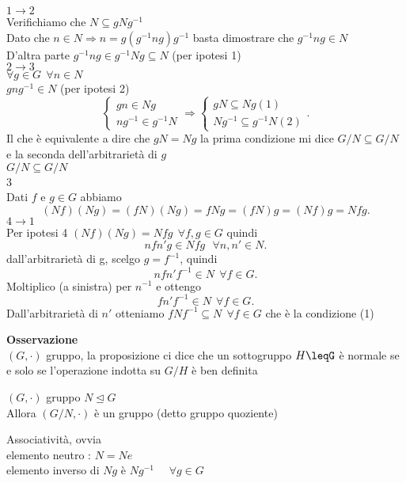 \documentclass[12px]{article}
\begin{document}
	\begin{dimo}
		$1 \rightarrow 2$\\
		Verifichiamo che $N\subseteq gNg^{-1}$\\
		Dato che  $n\in N \Rightarrow n = g(g^{-1}ng)g^{-1}$ basta dimostrare che $g^{-1}ng\in N$\\
		D'altra parte  $g^{-1}ng\in g^{-1}Ng\subseteq N$ (per ipotesi 1)\\
		$2 \rightarrow 3$\\
		$\forall g\in G \ \ \forall n\in N$\\
		$gng^{-1}\in N$ (per ipotesi 2)
		\[
		\begin{cases}
			gn\in Ng\\
			ng^{-1}\in g^{-1}N
		\end{cases} \Rightarrow \begin{cases}
			gN\subseteq Ng (1)\\
			Ng^{-1} \subseteq g^{-1}N (2)
		\end{cases}
		.\] 
		Il che è equivalente a dire che $gN = Ng$ la prima condizione mi dice $G/N\subseteq G/N$ e la seconda dell'arbitrarietà di  $g$\\
		 $G/N\subseteq G/N$\\
		 3  \\
		 Dati $f$ e $g\in G$ abbiamo
		 \[
			 (Nf)(Ng) = (fN)(Ng) = fNg = (fN)g = (Nf)g = Nfg
		 .\] 
		 $4 \rightarrow 1$\\
		 Per ipotesi 4 $(Nf)(Ng)=Nfg \ \ \forall f,g\in G$ quindi 
		  \[
		 nfn'g\in Nfg \ \ \ \forall n,n'\in N
		 .\] 
		 dall'arbitrarietà di g, scelgo $g=f^{-1}$, quindi 
		 \[
			 nfn'f^{-1}\in N \ \ \forall f\in G .\] 
			 Moltiplico (a sinistra) per $n^{-1}$ e ottengo\\
			 \[
				 fn'f^{-1}\in N \ \ \forall f\in G
			 .\] 
			 Dall'arbitrarietà di $n'$ otteniamo  $fNf^{-1}\subseteq N\ \ \forall f\in G$ che è la condizione (1) \\
	\end{dimo}
	\textbf{Osservazione}\\
	 $(G,\cdot)$ gruppo, la proposizione ci dice che un sottogruppo $H\leqG$ è normale se e solo se l'operazione indotta su $G/H$ è ben definita 
	 \begin{teo}
	 	$(G,\cdot)$ gruppo $N\trianglelefteq G$\\
		Allora $(G/N,\cdot)$ è un gruppo (detto gruppo quoziente)
	 \end{teo}
	 \begin{dimo}
	 	Associatività, ovvia\\
		elemento neutro : $N=Ne$\\
		elemento inverso di  $Ng$ è $Ng^{-1}$ \ \  $\forall g\in G$
	 \end{dimo}
\end{document}
